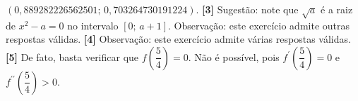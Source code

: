 \documentclass[12pt,a4paper]{article}
\begin{document}
$(0,889282226562501;\,0,703264730191224)$.
\textbf{[3]} Sugestão: note que $\sqrt{a}$ é a raiz de $x^2 - a = 0$ no intervalo $[0;\,a+1]$. Observação: este exercício admite outras respostas válidas. 
\textbf{[4]} Observação: este exercício admite várias respostas válidas.
\textbf{[5]} De fato, basta verificar que $f\left(\dfrac{5}{4}\right) = 0$. Não é possível, pois $f^\prime\left(\dfrac{5}{4}\right) = 0$ e 
$f^{\prime\prime}\left(\dfrac{5}{4}\right) > 0$.
\end{document}
